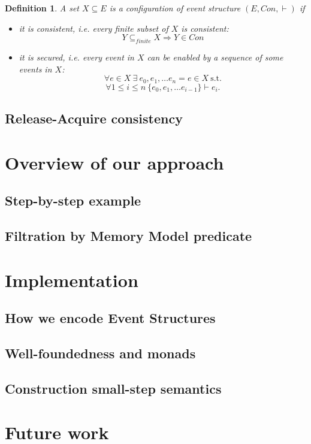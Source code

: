 \documentclass[conference]{IEEEtran}
\newtheorem{definition}{Definition}
\begin{document}
\begin{definition}
A set $X \subseteq E$ is a configuration of event structure $(E, Con, \vdash)$ if
\begin{itemize}
    \item it is consistent, i.e. every finite subset of $X$ is consistent:
    $$Y \subseteq_{finite} X \Longrightarrow Y \in Con$$
    \item it is secured, i.e. every event in $X$ can be enabled by a sequence of some events in $X$:
    $$\forall e \in X \ \exists \ e_0, e_1, \ldots e_n = e \in X \ \text{s.t.}$$
    $$\forall 1 \leq i \leq n \ \{ e_0, e_1, \ldots e_{i - 1} \} \vdash e_i.$$
\end{itemize}
\end{definition}

\subsection{Release-Acquire consistency}


\section{Overview of our approach}

\subsection{Step-by-step example}

\subsection{Filtration by Memory Model predicate}


\section{Implementation}

\subsection{How we encode Event Structures}

\subsection{Well-foundedness and monads}

\subsection{Construction small-step semantics}


\section{Future work}


\begin{thebibliography}{1}

\end{thebibliography}
\end{document}
